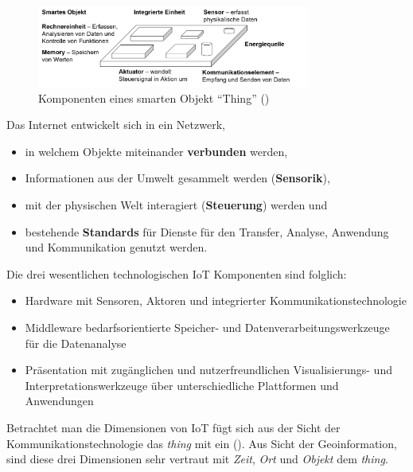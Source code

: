 \documentclass[
  11pt,
  a4paperpaper,
  oneside, openany  ,captions=tableheading
]{scrbook}
\providecommand{\tightlist}{%
  \setlength{\itemsep}{0pt}\setlength{\parskip}{0pt}}
\theoremstyle{definition}
\theoremstyle{remark}
\begin{document}
\begin{figure}[H]

{\centering \includegraphics[width=0.8\textwidth,height=\textheight]{images/smartes_objekt.png}

}

\caption{Komponenten eines smarten Objekt ``Thing''
()}

\end{figure}%

Das Internet entwickelt sich in ein Netzwerk,

\begin{itemize}
\tightlist
\item
  in welchem Objekte miteinander \textbf{verbunden} werden,
\item
  Informationen aus der Umwelt gesammelt werden (\textbf{Sensorik}),
\item
  mit der physischen Welt interagiert (\textbf{Steuerung}) werden und
\item
  bestehende \textbf{Standards} für Dienste für den Transfer, Analyse,
  Anwendung und Kommunikation genutzt werden.
\end{itemize}

Die drei wesentlichen technologischen IoT Komponenten sind folglich:

\begin{itemize}
\tightlist
\item
  Hardware mit Sensoren, Aktoren und integrierter
  Kommunikationstechnologie
\item
  Middleware bedarfsorientierte Speicher- und
  Datenverarbeitungswerkzeuge für die Datenanalyse
\item
  Präsentation mit zugänglichen und nutzerfreundlichen Visualisierungs-
  und Interpretationswerkzeuge über unterschiedliche Plattformen und
  Anwendungen
\end{itemize}

Betrachtet man die Dimensionen von IoT fügt sich aus der Sicht der
Kommunikationstechnologie das \emph{thing} mit ein
(). Aus Sicht der Geoinformation, sind
diese drei Dimensionen sehr vertraut mit \emph{Zeit}, \emph{Ort} und
\emph{Objekt} dem \emph{thing}.
\end{document}
